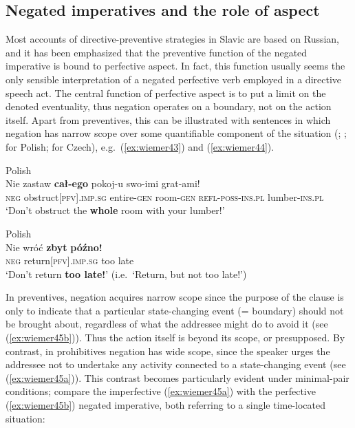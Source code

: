 \documentclass[output=paper,colorlinks,citecolor=brown]{langscibook}
\begin{document}
\subsection{Negated imperatives and the role of aspect}
\label{subsec:negimp}

Most accounts of directive-preventive strategies in Slavic are based on Russian, and it has been emphasized that the preventive function of the negated imperative is bound to perfective aspect. In fact, this function usually seems the only sensible interpretation of a negated perfective verb employed in a directive speech act. The central function of perfective aspect is to put a limit on the denoted eventuality, thus negation operates on a boundary, not on the action itself. Apart from preventives, this can be illustrated with sentences in which negation has narrow scope over some quantifiable component of the situation (\citealt[104]{Holvoet1989}; \citealt[38]{Luczkow1997}; \citealt[18]{Laskowski1998} for Polish; \citealt[122]{Kučera1984} for Czech), e.g.\ (\ref{ex:wiemer43}) and (\ref{ex:wiemer44}).

\newpage
\ea \textnormal{Polish} \\
\label{ex:wiemer43} 
\gll Nie zastaw \textbf{cał-ego} pokoj-u swo-imi grat-ami! \\
\textsc{neg} obstruct\textsc{[pfv].imp.sg} entire-\textsc{gen} room-\textsc{gen} \textsc{refl-poss-ins.pl} lumber-\textsc{ins.pl} \\
\glt `Don't obstruct the \textbf{whole} room with your lumber!'
\z


\ea \textnormal{Polish} \\
\label{ex:wiemer44}
\gll Nie wróć \textbf{zbyt} \textbf{późno!} \\
\textsc{neg} return\textsc{[pfv].imp.sg} too late \\
\glt `Don't return \textbf{too late!}' (i.e.\ `Return, but not too late!')
\z


 In preventives, negation acquires narrow scope since the purpose of the clause is only to indicate that a particular state-changing event (= boundary) should not be brought about, regardless of what the addressee might do to avoid it (see (\ref{ex:wiemer45b})). Thus the action itself is beyond its scope, or presupposed. By contrast, in prohibitives negation has wide scope, since the speaker urges the addressee not to undertake any activity connected to a state-changing event (see (\ref{ex:wiemer45a})). This contrast becomes particularly evident under minimal-pair conditions; compare the imperfective (\ref{ex:wiemer45a}) with the perfective (\ref{ex:wiemer45b}) negated imperative, both referring to a single time-located situation:
\end{document}
